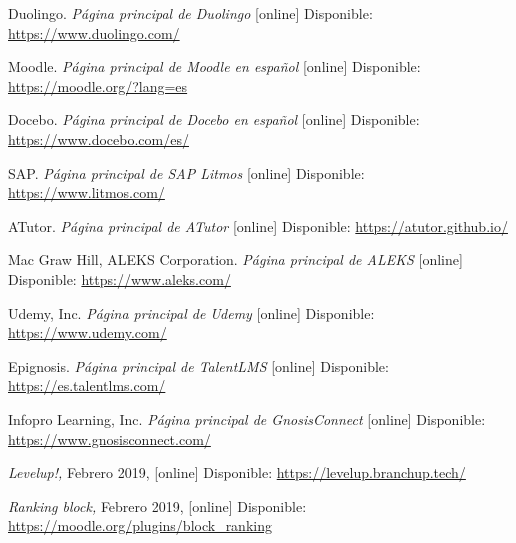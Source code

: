 \begin{thebibliography}{9}
       


    Duolingo. \textit{Página principal de Duolingo} [online] Disponible: \url{https://www.duolingo.com/}

    Moodle. \textit{Página principal de Moodle en español} [online] Disponible:
    \url{https://moodle.org/?lang=es}
    
    Docebo. \textit{Página principal de Docebo en español} [online] Disponible:
    \url{https://www.docebo.com/es/}
    
    SAP. \textit{Página principal de SAP Litmos} [online] Disponible:
    \url{https://www.litmos.com/}

    ATutor. \textit{Página principal de ATutor} [online] Disponible:
    \url{https://atutor.github.io/}

    Mac Graw Hill, ALEKS Corporation. \textit{Página principal de ALEKS} [online] Disponible:    
    \url{https://www.aleks.com/}

    Udemy, Inc. \textit{Página principal de Udemy} [online]  Disponible:
    \url{https://www.udemy.com/}
 
    Epignosis. \textit{Página principal de TalentLMS} [online]  Disponible:
    \url{https://es.talentlms.com/}

    Infopro Learning, Inc. \textit{Página principal de GnosisConnect} [online] Disponible:
    \url{https://www.gnosisconnect.com/}


        \textit{Levelup!,}
        Febrero 2019, [online] Disponible:  
        \url{https://levelup.branchup.tech/}
    
        \textit{Ranking block,}
        Febrero 2019, [online] Disponible:  
        \url{https://moodle.org/plugins/block_ranking}
    

\end{thebibliography}

